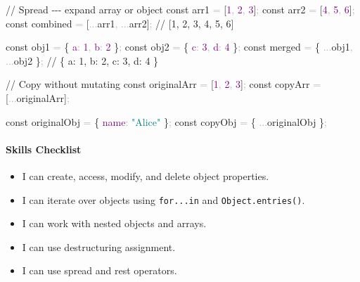 \documentclass[
  justified,
  openright,
]{tufte-book}
\let\subsubsection\paragraph
\let\paragraph\paragraph
\newcommand{\CommentTok}[1]{\textcolor{MidGray}{#1}}
\newcommand{\DataTypeTok}[1]{\textcolor{Purple}{#1}}
\newcommand{\DecValTok}[1]{\textcolor{Purple}{#1}}
\newcommand{\KeywordTok}[1]{\textcolor{BrandBlue}{#1}}
\newcommand{\NormalTok}[1]{#1}
\newcommand{\OperatorTok}[1]{\textcolor{DarkGray}{#1}}
\newcommand{\StringTok}[1]{\textcolor{Teal}{#1}}
\newenvironment{Shaded}{%
  \begin{snugshade}
}{%
  \end{snugshade}
}
\let\subsubsection\paragraph
\let\paragraph\paragraph
\providecommand{\tightlist}{%
  \setlength{\itemsep}{0pt}\setlength{\parskip}{0pt}}
\begin{document}
\begin{Shaded}
\begin{Highlighting}[]
\CommentTok{// Spread {-}{-}{-} expand array or object}
\KeywordTok{const}\NormalTok{ arr1 }\OperatorTok{=}\NormalTok{ [}\DecValTok{1}\OperatorTok{,} \DecValTok{2}\OperatorTok{,} \DecValTok{3}\NormalTok{]}\OperatorTok{;}
\KeywordTok{const}\NormalTok{ arr2 }\OperatorTok{=}\NormalTok{ [}\DecValTok{4}\OperatorTok{,} \DecValTok{5}\OperatorTok{,} \DecValTok{6}\NormalTok{]}\OperatorTok{;}
\KeywordTok{const}\NormalTok{ combined }\OperatorTok{=}\NormalTok{ [}\OperatorTok{...}\NormalTok{arr1}\OperatorTok{,} \OperatorTok{...}\NormalTok{arr2]}\OperatorTok{;} \CommentTok{// [1, 2, 3, 4, 5, 6]}

\KeywordTok{const}\NormalTok{ obj1 }\OperatorTok{=}\NormalTok{ \{ }\DataTypeTok{a}\OperatorTok{:} \DecValTok{1}\OperatorTok{,} \DataTypeTok{b}\OperatorTok{:} \DecValTok{2}\NormalTok{ \}}\OperatorTok{;}
\KeywordTok{const}\NormalTok{ obj2 }\OperatorTok{=}\NormalTok{ \{ }\DataTypeTok{c}\OperatorTok{:} \DecValTok{3}\OperatorTok{,} \DataTypeTok{d}\OperatorTok{:} \DecValTok{4}\NormalTok{ \}}\OperatorTok{;}
\KeywordTok{const}\NormalTok{ merged }\OperatorTok{=}\NormalTok{ \{ }\OperatorTok{...}\NormalTok{obj1}\OperatorTok{,} \OperatorTok{...}\NormalTok{obj2 \}}\OperatorTok{;} \CommentTok{// \{ a: 1, b: 2, c: 3, d: 4 \}}

\CommentTok{// Copy without mutating}
\KeywordTok{const}\NormalTok{ originalArr }\OperatorTok{=}\NormalTok{ [}\DecValTok{1}\OperatorTok{,} \DecValTok{2}\OperatorTok{,} \DecValTok{3}\NormalTok{]}\OperatorTok{;}
\KeywordTok{const}\NormalTok{ copyArr }\OperatorTok{=}\NormalTok{ [}\OperatorTok{...}\NormalTok{originalArr]}\OperatorTok{;}

\KeywordTok{const}\NormalTok{ originalObj }\OperatorTok{=}\NormalTok{ \{ }\DataTypeTok{name}\OperatorTok{:} \StringTok{"Alice"}\NormalTok{ \}}\OperatorTok{;}
\KeywordTok{const}\NormalTok{ copyObj }\OperatorTok{=}\NormalTok{ \{ }\OperatorTok{...}\NormalTok{originalObj \}}\OperatorTok{;}
\end{Highlighting}
\end{Shaded}

\subsubsection{Skills Checklist}\label{skills-checklist-9}

\begin{itemize}
\tightlist
\item[$\square$]
  I can create, access, modify, and delete object properties.
\item[$\square$]
  I can iterate over objects using \texttt{for...in} and
  \texttt{Object.entries()}.
\item[$\square$]
  I can work with nested objects and arrays.
\item[$\square$]
  I can use destructuring assignment.
\item[$\square$]
  I can use spread and rest operators.
\end{itemize}
\end{document}
